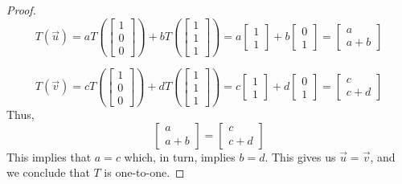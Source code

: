 \documentclass{ximera}
\begin{document}
\begin{example}
\begin{proof}
$$T(\vec{u})=aT\left(\begin{bmatrix}1\\0\\0\end{bmatrix}\right)+bT\left(\begin{bmatrix}1\\1\\1\end{bmatrix}\right)=a\begin{bmatrix}1\\1\end{bmatrix}+b\begin{bmatrix}0\\1\end{bmatrix}=\begin{bmatrix}a\\a+b\end{bmatrix}$$

$$T(\vec{v})=cT\left(\begin{bmatrix}1\\0\\0\end{bmatrix}\right)+dT\left(\begin{bmatrix}1\\1\\1\end{bmatrix}\right)=c\begin{bmatrix}1\\1\end{bmatrix}+d\begin{bmatrix}0\\1\end{bmatrix}=\begin{bmatrix}c\\c+d\end{bmatrix}$$
Thus,
$$\begin{bmatrix}a\\a+b\end{bmatrix}=\begin{bmatrix}c\\c+d\end{bmatrix}$$
This implies that $a=c$ which, in turn, implies $b=d$.  This gives us $\vec{u}=\vec{v}$, and we conclude that $T$ is one-to-one.


\end{proof}
\end{example}
\end{document}
